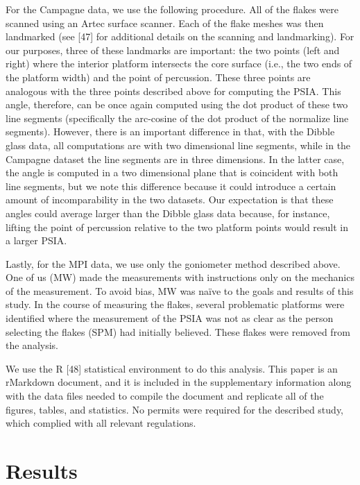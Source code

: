 \documentclass[10pt,letterpaper]{article}
\begin{document}
For the Campagne data, we use the following procedure. All of the flakes
were scanned using an Artec surface scanner. Each of the flake meshes
was then landmarked (see {[}47{]} for additional details on the scanning
and landmarking). For our purposes, three of these landmarks are
important: the two points (left and right) where the interior platform
intersects the core surface (i.e., the two ends of the platform width)
and the point of percussion. These three points are analogous with the
three points described above for computing the PSIA. This angle,
therefore, can be once again computed using the dot product of these two
line segments (specifically the arc-cosine of the dot product of the
normalize line segments). However, there is an important difference in
that, with the Dibble glass data, all computations are with two
dimensional line segments, while in the Campagne dataset the line
segments are in three dimensions. In the latter case, the angle is
computed in a two dimensional plane that is coincident with both line
segments, but we note this difference because it could introduce a
certain amount of incomparability in the two datasets. Our expectation
is that these angles could average larger than the Dibble glass data
because, for instance, lifting the point of percussion relative to the
two platform points would result in a larger PSIA.

Lastly, for the MPI data, we use only the goniometer method described
above. One of us (MW) made the measurements with instructions only on
the mechanics of the measurement. To avoid bias, MW was naïve to the
goals and results of this study. In the course of measuring the flakes,
several problematic platforms were identified where the measurement of
the PSIA was not as clear as the person selecting the flakes (SPM) had
initially believed. These flakes were removed from the analysis.

We use the R {[}48{]} statistical environment to do this analysis. This
paper is an rMarkdown document, and it is included in the supplementary
information along with the data files needed to compile the document and
replicate all of the figures, tables, and statistics. No permits were
required for the described study, which complied with all relevant
regulations.

\hypertarget{results}{%
\section{Results}\label{results}}
\end{document}
